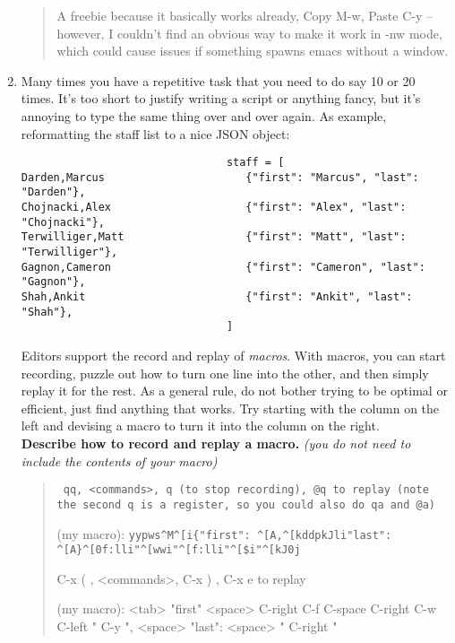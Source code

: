 \documentclass{article}
\begin{document}
\begin{enumerate}
\begin{quote}
      \color{red} A freebie because it basically works already, Copy M-w,
      Paste C-y -- however, I couldn't find an obvious way to make it work in
      -nw mode, which could cause issues if something spawns emacs without a
      window.
    \end{quote}
  \item Many times you have a repetitive task that you need to do say 10 or 20
    times. It's too short to justify writing a script or anything fancy, but
    it's annoying to type the same thing over and over again. As example,
    reformatting the staff list to a nice JSON object:
    \begin{verbatim}                                staff = [
Darden,Marcus                      {"first": "Marcus", "last": "Darden"},
Chojnacki,Alex                     {"first": "Alex", "last": "Chojnacki"},
Terwilliger,Matt                   {"first": "Matt", "last": "Terwilliger"},
Gagnon,Cameron                     {"first": "Cameron", "last": "Gagnon"},
Shah,Ankit                         {"first": "Ankit", "last": "Shah"},
                                ]\end{verbatim}
    Editors support the record and replay of \emph{macros}. With macros, you
    can start recording, puzzle out how to turn one line into the other, and
    then simply replay it for the rest. As a general rule, do not bother
    trying to be optimal or efficient, just find anything that works.
    Try starting with the column on the left and devising a macro to turn it
    into the column on the right.\\
    \textbf{Describe how to record and replay a macro.}
    \emph{\small (you do not need to include the contents of your macro)}
    \begin{quote}\tt
      \color{blue}qq, <commands>, q (to stop recording), @q to replay (note
      the second q is a register, so you could also do qa and @a)

      {\footnotesize(my macro): \verb!yypws^M^[i{"first": ^[A,^[kddpkJli"last": ^[A}^[0f:lli"^[wwi"^[f:lli"^[$i"^[kJ0j!}

      \color{red} C-x ( , <commands>, C-x ) , C-x e to replay

      {\footnotesize(my macro): <tab> {"first" <space> C-right C-f C-space C-right
          \newline C-w C-left " C-y ", <space> "last": <space> " C-right "}}
    \end{quote}


\end{enumerate}
\end{document}
